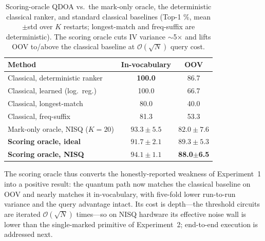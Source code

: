 \documentclass[journal]{IEEEtran}
\newcommand{\bigO}{\mathcal{O}}
\newcommand{\sqrtN}{\sqrt{N}}
\begin{document}
\begin{table}[t]
\centering
\caption{Scoring-oracle QDOA vs.\ the mark-only oracle, the deterministic
classical ranker, and standard classical baselines (Top-1 \%, mean$\pm$std over
$K$ restarts; longest-match and freq-suffix are deterministic). The scoring
oracle cuts IV variance $\sim$5$\times$ and lifts OOV to/above the classical
baseline at $\bigO(\sqrtN)$ query cost.}
\label{tab:scoring}
\small
\begin{tabular}{@{}lcc@{}}
\toprule
Method & In-vocabulary & OOV \\
\midrule
Classical, deterministic ranker   & \textbf{100.0} & 86.7 \\
Classical, learned (log.\ reg.)    & 100.0          & 66.7 \\
Classical, longest-match          & 80.0           & 40.0 \\
Classical, freq-suffix            & 81.3           & 53.3 \\
Mark-only oracle, NISQ ($K{=}20$) & $93.3\pm5.5$   & $82.0\pm7.6$ \\
\textbf{Scoring oracle, ideal}    & $91.7\pm2.1$   & $89.3\pm5.3$ \\
\textbf{Scoring oracle, NISQ}     & $94.1\pm1.1$   & \textbf{88.0}$\pm$\textbf{6.5} \\
\bottomrule
\end{tabular}
\end{table}

The scoring oracle thus converts the honestly-reported weakness of Experiment~1
into a positive result: the quantum path now matches the classical baseline on
OOV and nearly matches it in-vocabulary, with five-fold lower run-to-run variance
and the query advantage intact. Its cost is depth---the threshold circuits are
iterated $\bigO(\sqrtN)$ times---so on NISQ hardware its effective noise wall is
lower than the single-marked primitive of Experiment~2; end-to-end execution is
addressed next.
\end{document}
